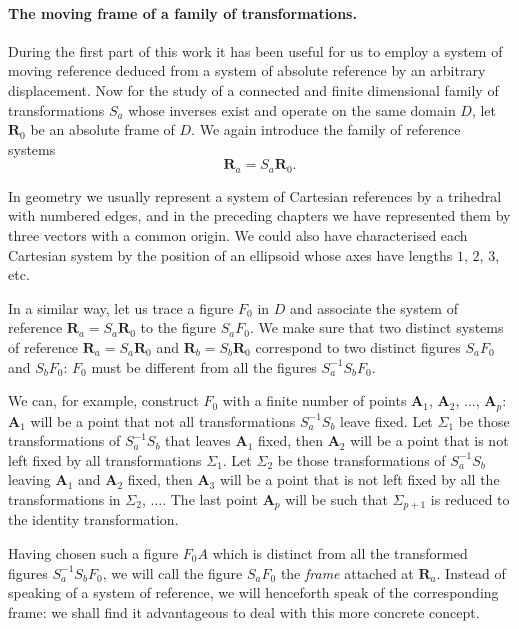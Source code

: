 \paragraph{The moving frame of a family of transformations.}
\label{sec:63}
During the first part of this work it has been useful for us to employ a system of moving reference deduced from a system of absolute reference by an arbitrary displacement. Now for the study of a connected and finite dimensional family of transformations $S_{a}$ whose inverses exist and operate on the same domain $D$, let $\mathbf{R}_{0}$ be an absolute frame of $D$. We again introduce the family of reference systems
\[
\mathbf{R}_{a}=S_{a}\mathbf{R}_{0}.
\]

In geometry we usually represent a system of Cartesian references by a trihedral with numbered edges, and in the preceding chapters we have represented them by three vectors with a common origin. We could also have characterised each Cartesian system by the position of an ellipsoid whose axes have lengths $1$, $2$, $3$, etc.

In a similar way, let us trace a figure ${F}_{0}$ in $D$ and associate the system of reference $\mathbf{R}_{a}=S_{a}\mathbf{R}_{0}$ to the figure $S_{a}F_{0}$. We make sure that two distinct systems of reference $\mathbf{R}_{a}=S_{a}\mathbf{R}_{0}$ and $\mathbf{R}_{b}=S_{b}\mathbf{R}_{0}$ correspond to two distinct figures $S_{a}F_{0}$ and $S_{b}F_{0}$: $F_{0}$ must be different from all the figures $S_{a}^{-1}S_{b}F_{0}$.

We can, for example, construct $F_{0}$ with a finite number of points $\mathbf{A}_{1}$, $\mathbf{A}_{2}$, $\dots$, $\mathbf{A}_{p}$: $\mathbf{A}_{1}$ will be a point that not all transformations $S_{a}^{-1}S_{b}$ leave fixed. Let $\Sigma_{1}$ be those transformations of $S_{a}^{-1}S_{b}$ that leaves $\mathbf{A}_{1}$ fixed, then $\mathbf{A}_{2}$ will be a point that is not left fixed by all transformations $\Sigma_{1}$. Let $\Sigma_{2}$ be those transformations of $S_{a}^{-1}S_{b}$ leaving $\mathbf{A}_{1}$ and $\mathbf{A}_{2}$ fixed, then $\mathbf{A}_{3}$ will be a point that is not left fixed by all the transformations in $\Sigma_{2}$, $\dots$. The last point $\mathbf{A}_{p}$ will be such that $\Sigma_{p+1}$ is reduced to the identity transformation.

Having chosen such a figure $F_{0}A$ which is distinct from all the transformed figures $S_{a}^{-1}S_{b}F_{0}$, we will call the figure $S_{a}F_{0}$ the \emph{frame} attached at $\mathbf{R}_{a}$. Instead of speaking of a system of reference, we will henceforth speak of the corresponding frame: we shall find it advantageous to deal with this more concrete concept.

